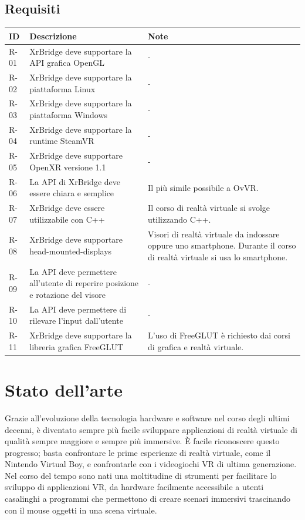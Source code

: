 \documentclass[twoside]{supsistudent}
\begin{document}

\section{Requisiti}

\begin{center}
  \begin{tabular}{ | m{1cm} | m{6cm} | m{6cm} | }
    \hline
    ID   & Descrizione & Note \\
    \hline
    R-01 & XrBridge deve supportare la API grafica OpenGL & - \\
    \hline
    R-02 & XrBridge deve supportare la piattaforma Linux & - \\
    \hline
    R-03 & XrBridge deve supportare la piattaforma Windows & - \\
    \hline
    R-04 & XrBridge deve supportare la runtime SteamVR & - \\
    \hline
    R-05 & XrBridge deve supportare OpenXR versione 1.1 & - \\
    \hline
    R-06 & La API di XrBridge deve essere chiara e semplice & Il più simile possibile a OvVR. \\
    \hline
    R-07 & XrBridge deve essere utilizzabile con C++ & Il corso di realtà virtuale si svolge utilizzando C++. \\
    \hline
    R-08 & XrBridge deve supportare head-mounted-displays & Visori di realtà virtuale da indossare oppure uno smartphone. Durante il corso di realtà virtuale si usa lo smartphone. \\
    \hline
    R-09 & La API deve permettere all'utente di reperire posizione e rotazione del visore & - \\
    \hline
    R-10 & La API deve permettere di rilevare l'input dall'utente & - \\
    \hline
    R-11 & XrBridge deve supportare la libreria grafica FreeGLUT & L'uso di FreeGLUT è richiesto dai corsi di grafica e realtà virtuale. \\
    \hline
  \end{tabular}
\end{center}

\chapter{Stato dell'arte}

Grazie all'evoluzione della tecnologia hardware e software nel corso degli ultimi decenni, è diventato sempre più facile sviluppare applicazioni di realtà virtuale di qualità sempre maggiore e sempre più immersive. È facile riconoscere questo progresso; basta confrontare le prime esperienze di realtà virtuale, come il Nintendo Virtual Boy, e confrontarle con i videogiochi VR di ultima generazione. Nel corso del tempo sono nati una moltitudine di strumenti per facilitare lo sviluppo di applicazioni VR, da hardware facilmente accessibile a utenti casalinghi a programmi che permettono di creare scenari immersivi trascinando con il mouse oggetti in una scena virtuale.
\end{document}
